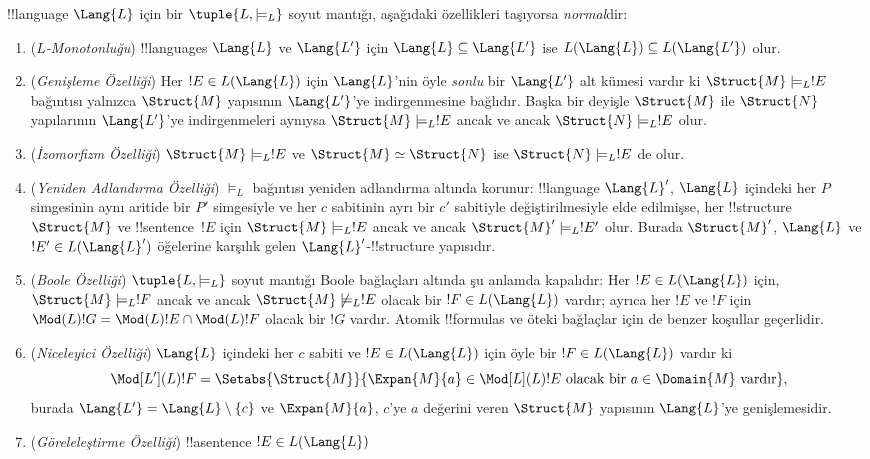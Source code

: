 \begin{defn}
!!{language} $\Lang{L}$ için bir $\tuple{L,\models_L}$ soyut mantığı,
aşağıdaki özellikleri taşıyorsa \emph{normal}dir:
\begin{enumerate}
\item (\emph{$L$-Monotonluğu}) !!{language}s $\Lang{L}$ ve $\Lang{L'}$
  için $\Lang{L} \subseteq \Lang{L'}$ ise
  $L(\Lang{L}) \subseteq L(\Lang{L'})$ olur.
\item (\emph{Genişleme Özelliği}) Her $!E \in L(\Lang{L})$ için
  $\Lang{L}$'nin öyle \emph{sonlu} bir $\Lang{L'}$ alt kümesi vardır ki
  $\Struct{M} \models_L !E$ bağıntısı yalnızca $\Struct{M}$ yapısının
  $\Lang{L'}$'ye indirgenmesine bağlıdır. Başka bir deyişle $\Struct{M}$
  ile $\Struct{N}$ yapılarının $\Lang{L'}$'ye indirgenmeleri aynıysa
  $\Struct{M} \models_L !E$ ancak ve ancak $\Struct{N} \models_L !E$ olur.
\item (\emph{İzomorfizm Özelliği}) $\Struct{M} \models_L !E$ ve
  $\Struct{M} \simeq \Struct{N}$ ise $\Struct{N} \models_L !E$ de olur.
\item (\emph{Yeniden Adlandırma Özelliği}) $\models_L$ bağıntısı yeniden
  adlandırma altında korunur: !!{language} $\Lang{L}'$, $\Lang{L}$ içindeki
  her $P$ simgesinin aynı aritide bir $P'$ simgesiyle ve her $c$ sabitinin
  ayrı bir $c'$ sabitiyle değiştirilmesiyle elde edilmişse, her
  !!{structure}~$\Struct{M}$ ve !!{sentence}~$!E$ için
  $\Struct{M} \models_L !E$ ancak ve ancak
  $\Struct{M}' \models_L !E'$ olur. Burada $\Struct{M}'$, $\Lang{L}$ ve
  $!E' \in L(\Lang{L}')$ öğelerine karşılık gelen $\Lang{L}'$-!!{structure}
  yapısıdır.
\item (\emph{Boole Özelliği}) $\tuple{L,\models_L}$ soyut mantığı Boole
  bağlaçları altında şu anlamda kapalıdır: Her $!E \in L(\Lang{L})$ için,
  $\Struct{M} \models_L !F$ ancak ve ancak
  $\Struct{M} \not\models_L !E$ olacak bir $!F \in L(\Lang{L})$ vardır;
  ayrıca her $!E$ ve $!F$ için
  $\Mod(L){!G}=\Mod(L){!E}\cap\Mod(L){!F}$ olacak bir $!G$ vardır.
  Atomik !!{formula}s ve öteki bağlaçlar için de benzer koşullar geçerlidir.
\item (\emph{Niceleyici Özelliği}) $\Lang{L}$ içindeki her $c$ sabiti ve
  $!E \in L(\Lang{L})$ için öyle bir $!F \in L(\Lang{L})$ vardır ki
  \[
  \Mod[L'](L){!F} = \Setabs{\Struct{M}}{\Expan{M}{a} \in
  \Mod[L](L){!E} \text{ olacak bir } a \in \Domain{M} \text{ vardır}},
  \]
  burada $\Lang{L'}=\Lang{L}\setminus\{c\}$ ve $\Expan{M}{a}$,
  $c$'ye $a$ değerini veren $\Struct{M}$ yapısının $\Lang{L}$'ye
  genişlemesidir.
\item (\emph{Göreleleştirme Özelliği}) !!a{sentence} $!E\in L(\Lang{L})$

\end{enumerate}
\end{defn}
